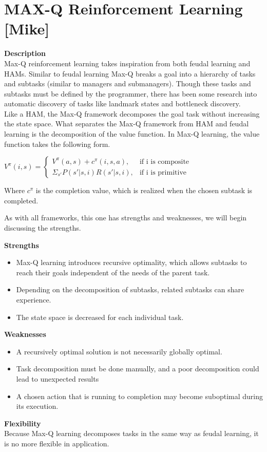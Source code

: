 \section{MAX-Q Reinforcement Learning [Mike]}
\textbf{Description} \\
Max-Q reinforcement learning takes inspiration from both feudal learning and HAMs. Similar to feudal learning Max-Q breaks a goal into a hierarchy of tasks and subtasks (similar to managers and submanagers). Though these tasks and subtasks must be defined by the programmer, there has been some research into automatic discovery of tasks like landmark states and bottleneck discovery. \\

Like a HAM, the Max-Q framework decomposes the goal task without increasing the state space. What separates the Max-Q framework from HAM and feudal learning is the decomposition of the value function. In Max-Q learning, the value function takes the following form.

\begin{math}
V^{\pi}(i, s) = 
\begin{cases}
V^{\pi}(a, s) + c^{\pi}(i, s, a), & \text{if i is composite}\\
\Sigma_{s'}P(s'|s, i)R(s'|s, i), & \text{if i is primitive}
\end{cases}
\end{math}

Where $c^{\pi}$ is the completion value, which is realized when the chosen subtask is completed. 

As with all frameworks, this one has strengths and weaknesses, we will begin discussing the strengths.

\textbf{Strengths}
\begin{itemize}
    \item Max-Q learning introduces recursive optimality, which allows subtasks	to reach their goals independent of the needs of the parent task.
    \item Depending on the decomposition of subtasks, related subtasks can share experience.
    \item The state space is decreased for each individual task.
\end{itemize}

\textbf{Weaknesses}
\begin{itemize}
    \item A recursively optimal solution is not necessarily globally optimal. 
    \item Task decomposition must be done manually, and a poor decomposition could lead to unexpected results
    \item A chosen action that is running to completion may become suboptimal during its execution.
\end{itemize}

\textbf{Flexibility} \\
Because Max-Q learning decomposes tasks in the same way as feudal learning, it is no more flexible in application.

